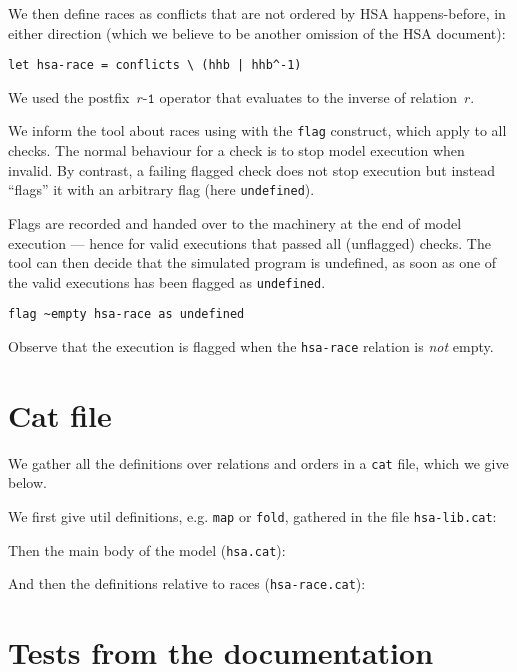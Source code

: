 \documentclass[a4paper]{article}
\begin{document}
We then define races as conflicts that are not ordered by HSA happens-before,
in either direction (which we believe to be another omission of the HSA
document):
\begin{verbatim}
let hsa-race = conflicts \ (hhb | hhb^-1)
\end{verbatim}
We used the postfix~$r\texttt{\^{}-1}$ operator that evaluates to
the inverse of relation~$r$.

We inform the  tool about races using with the \texttt{flag}
construct, which apply to all checks.  The normal behaviour for a check is to
stop model execution when invalid.  By contrast, a failing flagged check does
not stop execution but instead ``flags'' it with an arbitrary flag (here
\verb+undefined+).

Flags are recorded and handed over to the  machinery at the end of
model execution --- hence for valid executions that passed all (unflagged)
checks.  The  tool can then decide that the simulated program is
undefined, as soon as one of the valid executions has been flagged as
\verb+undefined+.
\begin{verbatim}
flag ~empty hsa-race as undefined
\end{verbatim}
Observe that the execution is flagged when the \verb+hsa-race+ relation is
\emph{not} empty.

\pagebreak

\section{Cat file}

We gather all the definitions over relations and orders in a {\tt cat} file,
which we give below.

We first give util definitions, e.g. {\tt map} or {\tt fold}, gathered in the file {\tt hsa-lib.cat}:


\pagebreak

Then the main body of the model ({\tt hsa.cat}):


\pagebreak

And then the definitions relative to races ({\tt hsa-race.cat}):



\pagebreak

\section{Tests from the documentation}
\end{document}
